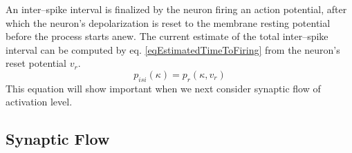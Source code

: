 
	An inter--spike interval is finalized by the neuron firing an action potential, after which the neuron's depolarization is reset to the membrane resting potential before the process starts anew.
	The current estimate of the total inter--spike interval can be computed by eq. \eqref{eqEstimatedTimeToFiring} from the neuron's reset potential $v_r$.
\begin{equation}
	p_{isi}(\kappa) = p_r(\kappa, v_r)%
	\label{eqEstimateOfInterSpikePeriod}
\end{equation}
	This equation will show important when we next consider synaptic flow of activation level.
	


    \subsection{Synaptic Flow}
	\label{ssecSynapticFlow}


